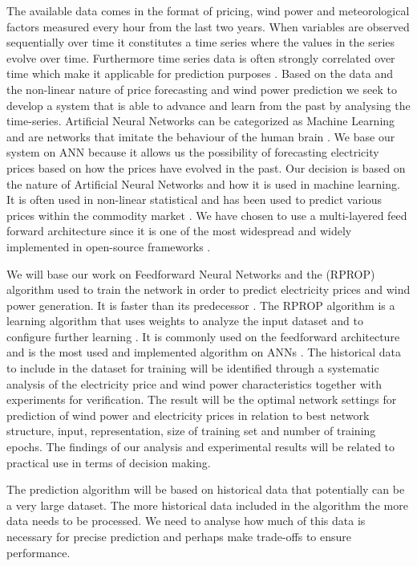 The available data comes in the format of pricing, wind power and meteorological factors measured every hour from the last two years. When variables are observed sequentially over time it constitutes a time series where the values in the series evolve over time. Furthermore time series data is often strongly correlated over time which make it applicable for prediction purposes \cite[Chapter~7.1.2]{econometrics}. Based on the data and the non-linear nature of price forecasting and wind power prediction we seek to develop a system that is able to advance and learn from the past by analysing the time-series. Artificial Neural Networks can be categorized as Machine Learning \cite{18} and are networks that imitate the behaviour of the human brain \cite{1}. We base our system on ANN because it allows us the possibility of forecasting electricity prices based on how the prices have evolved in the past. Our decision is based on the nature of Artificial Neural Networks and how it is used in machine learning. It is often used in non-linear statistical  and has been used to predict various prices within the commodity market \cite{2,3,stockForecasting,pjmForecast}. We have chosen to use a multi-layered feed forward architecture since it is one of the most widespread and widely implemented in open-source frameworks \cite{17}.

We will base our work on Feedforward Neural Networks and the  (RPROP) algorithm used to train the network in order to predict electricity prices and wind power generation. It is faster than its predecessor  \cite{15}. The RPROP algorithm is a learning algorithm that uses weights to analyze the input dataset and to configure further learning \cite{17}. It is commonly used on the feedforward architecture and is the most used and implemented algorithm on ANNs \cite{17}. The historical data to include in the dataset for training will be identified through a systematic analysis of the electricity price and wind power characteristics together with experiments for verification. The result will be the optimal network settings for prediction of wind power and electricity prices in relation to best network structure, input, representation, size of training set and number of training epochs. The findings of our analysis and experimental results will be related to practical use in terms of decision making. 

The prediction algorithm will be based on historical data that potentially can be a very large dataset. The more historical data included in the algorithm the more data needs to be processed. We need to analyse how much of this data is necessary for precise prediction and perhaps make trade-offs to ensure performance.